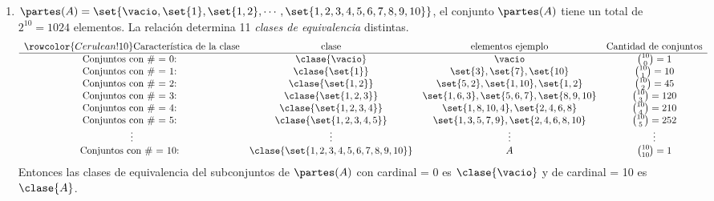 \begin{enumerate}[label=\roman*)]
  \item $\partes(A) = \set{\vacio, \set{1}, \set{1,2}, \cdots, \set{1, 2, 3, 4, 5, 6, 7, 8, 9, 10}}$, el conjunto $\partes(A)$ tiene un total de
        $2^{10} = 1024$ elementos. La relación determina 11 \textit{clases de equivalencia} distintas.
        $$
          \begin{array}{cccc}
            \rowcolor{Cerulean!10}
            \text{Característica de la clase} & \text{clase}                       & \text{elementos ejemplo}                  & \text{Cantidad de conjuntos} \\ \hline
            \text{Conjuntos con \# = 0: }     & \clase{\vacio}                     & \vacio                                    & \binom{10}{0} = 1            \\
            \text{Conjuntos con \# = 1: }     & \clase{\set{1}}                    & \set{3}, \set{7}, \set{10}                & \binom{10}{1} = 10           \\
            \text{Conjuntos con \# = 2: }     & \clase{\set{1,2}}                  & \set{5,2}, \set{1,10}, \set{1,2}          & \binom{10}{2} = 45           \\
            \text{Conjuntos con \# = 3: }     & \clase{\set{1,2,3}}                & \set{1,6, 3}, \set{5,6,7}, \set{8, 9, 10} & \binom{10}{3} = 120          \\
            \text{Conjuntos con \# = 4: }     & \clase{\set{1,2,3,4}}              & \set{1,8, 10,4}, \set{2,4,6,8}            & \binom{10}{4} = 210          \\
            \text{Conjuntos con \# = 5: }     & \clase{\set{1,2,3,4,5}}            & \set{1,3, 5, 7, 9}, \set{2,4,6,8, 10}     & \binom{10}{5} = 252          \\
            \vdots                            & \vdots                             & \vdots                                    & \vdots                       \\
            \text{Conjuntos con \# = 10: }    & \clase{\set{1,2,3,4,5,6,7,8,9,10}} & A                                         & \binom{10}{10} = 1           \\
          \end{array}
        $$
        Entonces las clases de equivalencia del subconjuntos de $\partes(A)$ con cardinal = 0 es $\clase{\vacio}$ y
        de cardinal = 10 es $\clase{A}$.


\end{enumerate}
